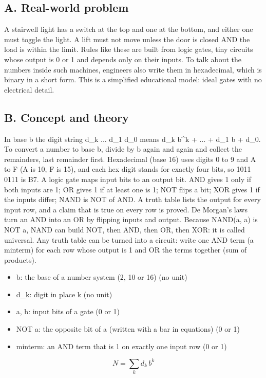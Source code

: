 \documentclass[11pt,a4paper]{article}
\begin{document}
\subsection*{A. Real-world problem}
A stairwell light has a switch at the top and one at the bottom, and either one must toggle the light. A lift must not move unless the door is closed AND the load is within the limit. Rules like these are built from logic gates, tiny circuits whose output is 0 or 1 and depends only on their inputs. To talk about the numbers inside such machines, engineers also write them in hexadecimal, which is binary in a short form. This is a simplified educational model: ideal gates with no electrical detail.

\subsection*{B. Concept and theory}
In base b the digit string d\_k ... d\_1 d\_0 means d\_k b\textasciicircum{}k + ... + d\_1 b + d\_0. To convert a number to base b, divide by b again and again and collect the remainders, last remainder first. Hexadecimal (base 16) uses digits 0 to 9 and A to F (A is 10, F is 15), and each hex digit stands for exactly four bits, so 1011 0111 is B7. A logic gate maps input bits to an output bit. AND gives 1 only if both inputs are 1; OR gives 1 if at least one is 1; NOT flips a bit; XOR gives 1 if the inputs differ; NAND is NOT of AND. A truth table lists the output for every input row, and a claim that is true on every row is proved. De Morgan's laws turn an AND into an OR by flipping inputs and output. Because NAND(a, a) is NOT a, NAND can build NOT, then AND, then OR, then XOR: it is called universal. Any truth table can be turned into a circuit: write one AND term (a minterm) for each row whose output is 1 and OR the terms together (sum of products).

\begin{itemize}[nosep]
\item b: the base of a number system (2, 10 or 16) (no unit)
\item d\_k: digit in place k (no unit)
\item a, b: input bits of a gate (0 or 1)
\item NOT a: the opposite bit of a (written with a bar in equations) (0 or 1)
\item minterm: an AND term that is 1 on exactly one input row (0 or 1)
\end{itemize}

\begin{equation*}
N=\sum_k d_k\,b^{k}
\end{equation*}
\end{document}

